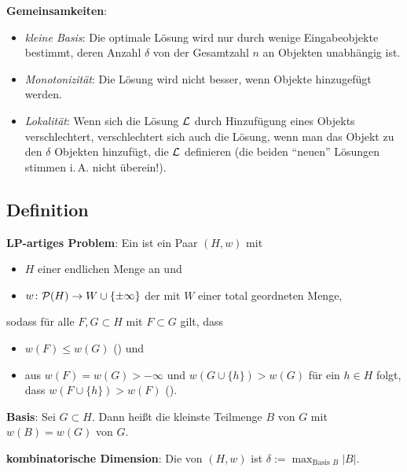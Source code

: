 \textbf{Gemeinsamkeiten}:
\begin{itemize}
    \item
    \emph{kleine Basis}:
    Die optimale Lösung wird nur durch wenige Eingabeobjekte bestimmt,
    deren Anzahl $\delta$ von der Gesamtzahl $n$ an Objekten unabhängig ist.

    \item
    \emph{Monotonizität}:
    Die Lösung wird nicht besser, wenn Objekte hinzugefügt werden.

    \item
    \emph{Lokalität}:
    Wenn sich die Lösung $\L$ durch Hinzufügung eines Objekts verschlechtert,
    verschlechtert sich auch die Lösung, wenn man das Objekt zu den $\delta$ Objekten
    hinzufügt, die $\L$ definieren
    (die beiden "`neuen"' Lösungen stimmen i.\,A. nicht überein!).
\end{itemize}

\pagebreak

\subsection{%
    Definition%
}

\textbf{LP-artiges Problem}:
Ein  ist ein Paar $(H, w)$ mit
\begin{itemize}
    \item
    $H$ einer endlichen Menge an  und

    \item
    $w\colon \P(H) \to W \cup \{\pm\infty\}$ der  mit
    $W$ einer total geordneten Menge,
\end{itemize}
sodass für alle $F, G \subset H$ mit $F \subset G$ gilt, dass
\begin{itemize}
    \item
    $w(F) \le w(G)$
    () und

    \item
    aus $w(F) = w(G) > -\infty$ und $w(G \cup \{h\}) > w(G)$ für ein $h \in H$ folgt,\\
    dass $w(F \cup \{h\}) > w(F)$
    ().
\end{itemize}

\linie

\textbf{Basis}:
Sei $G \subset H$.
Dann heißt die kleinste Teilmenge $B$ von $G$ mit $w(B) = w(G)$  von $G$.

\textbf{kombinatorische Dimension}:
Die  von $(H, w)$ ist $\delta := \max_{\text{Basis $B$}} |B|$.


